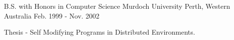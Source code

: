 

\begin{cventries}

  \cventry
    {B.S. with Honors in Computer Science} %
    {Murdoch University} %
    {Perth, Western Australia} %
    {Feb. 1999 - Nov. 2002} %
    {
      \begin{cvitems} %
        \item {Thesis - Self Modifying Programs in Distributed Environments.}
      \end{cvitems}
    }

\end{cventries}
